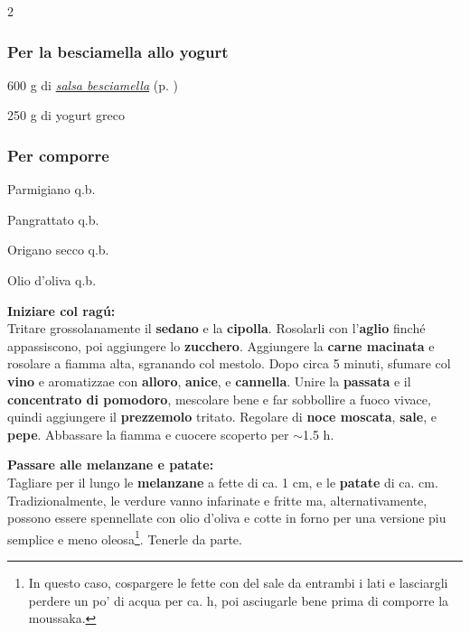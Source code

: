 \begin{multicols}{2}
	\subsubsection*{Per la besciamella allo yogurt}
	\begin{ingredients}
		\item 600 g di \hyperref[sauce_bechamel]{\textit{salsa besciamella}} (p. \pageref{sauce_bechamel})
		\item 250 g di yogurt greco
	\end{ingredients}
	
	\subsubsection*{Per comporre}
	\begin{ingredients}
		\item Parmigiano q.b.
		\item Pangrattato q.b.
		\item Origano secco q.b.
		\item Olio d'oliva q.b.
	\end{ingredients}
	
\end{multicols}

\textbf{Iniziare col ragú:} \\
Tritare grossolanamente il \textbf{sedano} e la \textbf{cipolla}.
Rosolarli con l'\textbf{aglio} finché appassiscono, poi aggiungere lo \textbf{zucchero}.
Aggiungere la \textbf{carne macinata} e rosolare a fiamma alta, sgranando col mestolo. 
Dopo circa 5 minuti, sfumare col \textbf{vino} e aromatizzae con \textbf{alloro}, \textbf{anice}, e \textbf{cannella}.
Unire la \textbf{passata} e il \textbf{concentrato di pomodoro}, mescolare bene e far sobbollire a fuoco vivace, quindi aggiungere il \textbf{prezzemolo} tritato.
Regolare di \textbf{noce moscata}, \textbf{sale}, e \textbf{pepe}. 
Abbassare la fiamma e cuocere scoperto per $\sim$1.5 h.

\textbf{Passare alle melanzane e patate:} \\ 
Tagliare per il lungo le \textbf{melanzane} a fette di ca. 1 cm, e le \textbf{patate} di ca.  cm. 
Tradizionalmente, le verdure vanno infarinate e fritte ma, alternativamente, possono essere spennellate con olio d'oliva e cotte in forno per una versione piu semplice e meno oleosa\footnote{In questo caso, cospargere le fette con del sale da entrambi i lati e lasciargli perdere un po' di acqua per ca. h, poi asciugarle bene prima di comporre la moussaka.}. 
Tenerle da parte.

